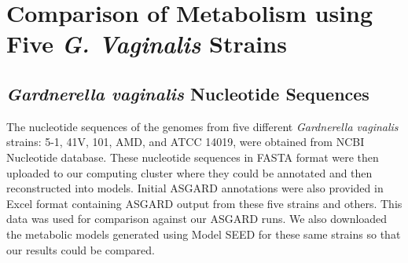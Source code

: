 
\chapter{Comparison of Metabolism using Five \textit{G. Vaginalis} Strains} %

\label{Chapter4} %

\section{\textit{Gardnerella vaginalis} Nucleotide Sequences}
\indent\indent The nucleotide sequences of the genomes from five different \textit{Gardnerella vaginalis} strains: 5-1, 41V, 101, AMD, and ATCC 14019, were obtained from NCBI Nucleotide database. These nucleotide sequences in FASTA format were then uploaded to our computing cluster where they could be annotated and then reconstructed into models. Initial ASGARD annotations were also provided in Excel format containing ASGARD output from these five strains and others.  This data was used for comparison against our ASGARD runs. We also downloaded the metabolic models generated using Model SEED for these same strains so that our results could be compared.\\
%
%

